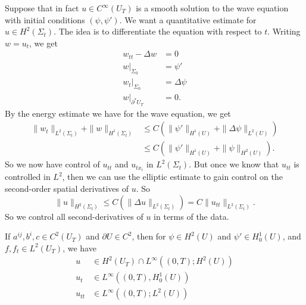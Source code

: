 \documentclass[a4paper]{article}
\begin{document}
Suppose that in fact $u \in C^\infty(U_T)$ is a smooth solution to the wave equation with initial conditions $(\psi, \psi')$. We want a quantitative estimate for $u \in H^2(\Sigma_t)$. The idea is to differentiate the equation with respect to $t$. Writing $w = u_t$, we get
\begin{align*}
  w_{tt} - \Delta w &= 0\\
  w|_{\Sigma_0} &= \psi'\\
  w_t|_{\Sigma_0} &= \Delta \psi\\
  w|_{\partial^* U_T} &= 0.
\end{align*}
By the energy estimate we have for the wave equation, we get
\begin{align*}
  \|w_t\|_{L^2(\Sigma_t)} + \|w\|_{H^1(\Sigma_t)} &\leq C(\|\psi'\|_{H^1(U)} + \|\Delta \psi\|_{L^2(U)})\\
  &\leq C(\|\psi'\|_{H^1(U)} + \|\psi\|_{H^2(U)}).
\end{align*}
So we now have control of $u_{tt}$ and $u_{tx_i}$ in $L^2(\Sigma_t)$. But once we know that $u_{tt}$ is controlled in $L^2$, then we can use the elliptic estimate to gain control on the second-order spatial derivatives of $u$. So
\[
  \|u\|_{H^2(\Sigma_t)}\leq C(\|\Delta u\|_{L^2(\Sigma_t)}) = C \|u_{tt}\|_{L^2(\Sigma_t)}.
\]
So we control all second-derivatives of $u$ in terms of the data.

\begin{thm}
  If $a^{ij}, b^i, c \in C^2(U_T)$ and $\partial U \in C^2$, then for $\psi \in H^2(U)$ and $\psi' \in H_0^1(U)$, and $f, f_t \in L^2(U_T)$, we have
  \begin{align*}
    u &\in H^2(U_T) \cap L^\infty((0, T); H^2(U))\\
    u_t &\in L^\infty((0, T), H_0^1(U))\\
    u_{tt} &\in L^\infty((0, T); L^2(U))
  \end{align*}
\end{thm}
\end{document}
